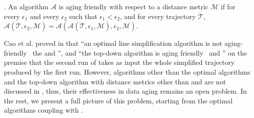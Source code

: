 . {An \lsa algorithm $\mathcal{A}$ is aging friendly with respect to a distance metric $\mathcal{M}$ if for every $\epsilon_1$ and every $\epsilon_2$ such that $\epsilon_1 < \epsilon_2$, and for every trajectory $\dddot{\mathcal{T}}$, $\mathcal{A}(\dddot{\mathcal{T}}, \epsilon_2, \mathcal{M})= \mathcal{A}(\mathcal{A}(\dddot{\mathcal{T}}, \epsilon_1, \mathcal{M}), \epsilon_2, \mathcal{M})$.}

Cao et al. proved in \cite{Cao:Spatio} that ``an optimal line simplification algorithm is not aging-friendly \wrt~the \ped and \sed'', and ``the top-down algorithm \dpa is aging friendly \wrt~\ped and \sed'' on the premise that the second run of \dpa takes as input the whole simplified trajectory produced by the first run.
However, algorithms other than the optimal algorithms and the top-down algorithm \dpa with distance metrics other than \ped and \sed are not discussed in \cite{Cao:Spatio}, thus, their effectiveness in data aging remains an open problem.
In the rest, we  present a full picture of this problem, starting from the optimal algorithms coupling with \dad.

